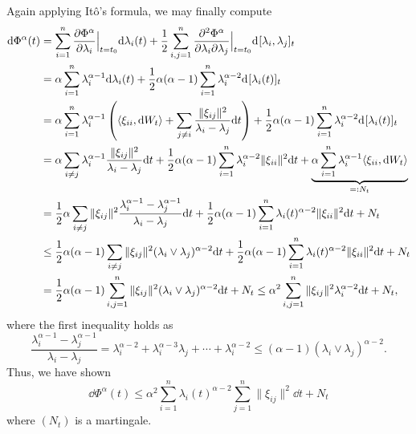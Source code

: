 Again applying Itô's formula, we may finally compute
\begin{align*}
  \dd \Phi^\alpha(t) & = \sum_{i = 1}^n \pdv{\Phi^\alpha}{\lambda_i}\Big\vert_{t = t_0} \dd \lambda_i(t)
    + \frac{1}{2}\sum_{i, j = 1}^n \pdv[2]{\Phi^\alpha}{\lambda_i}{\lambda_j}\Big\vert_{t = t_0} \dd[][\lambda_i, \lambda_j]_{t}\\
  & = \alpha \sum_{i = 1}^n \lambda_i^{\alpha - 1} \dd \lambda_i(t)
    + \frac{1}{2}\alpha(\alpha - 1)\sum_{i = 1}^n \lambda_i^{\alpha - 2} \dd[][\lambda_i(t)]_{t}\\
  & = \alpha \sum_{i = 1}^n \lambda_i^{\alpha - 1} \left(\langle \xi_{ii}, \dd W_t\rangle 
    + \sum_{j \neq i} \frac{\|\xi_{ij}\|^2}{\lambda_i - \lambda_j} \dd t\right) 
    + \frac{1}{2}\alpha(\alpha - 1)\sum_{i = 1}^n \lambda_i^{\alpha - 2} \dd[][\lambda_i(t)]_{t}\\
  & = \alpha \sum_{i \neq j}\lambda_i^{\alpha - 1} \frac{\|\xi_{ij}\|^2}{\lambda_i - \lambda_j} \dd t 
    + \frac{1}{2}\alpha(\alpha - 1)\sum_{i = 1}^n \lambda_i^{\alpha - 2} \|\xi_{ii}\|^2 \dd t
    + \underbrace{\alpha \sum_{i = 1}^n \lambda_i^{\alpha - 1} \langle \xi_{ii}, \dd W_t\rangle}_{=: N_t}\\
  & = \frac{1}{2}\alpha \sum_{i \neq j}\|\xi_{ij}\|^2\frac{\lambda_i^{\alpha - 1} - \lambda_j^{\alpha -1}}{\lambda_i - \lambda_j}\dd t
    + \frac{1}{2}\alpha(\alpha - 1)\sum_{i = 1}^n \lambda_i(t)^{\alpha - 2} \|\xi_{ii}\|^2 \dd t + N_t\\
  & \le \frac{1}{2}\alpha(\alpha - 1) \sum_{i \neq j}\|\xi_{ij}\|^2 (\lambda_i \vee \lambda_j)^{\alpha - 2} \dd t
    + \frac{1}{2}\alpha(\alpha - 1)\sum_{i = 1}^n \lambda_i(t)^{\alpha - 2} \|\xi_{ii}\|^2 \dd t + N_t\\
  & = \frac{1}{2}\alpha(\alpha - 1) \sum_{i, j = 1}^n\|\xi_{ij}\|^2 (\lambda_i \vee \lambda_j)^{\alpha - 2} \dd t
    + N_t
    \le \alpha^2 \sum_{i, j = 1}^n\|\xi_{ij}\|^2 \lambda_i^{\alpha - 2} \dd t + N_t,
\end{align*}
where the first inequality holds as 
\[\frac{\lambda_i^{\alpha - 1} - \lambda_j^{\alpha -1}}{\lambda_i - \lambda_j}
  = \lambda_i^{\alpha - 2} + \lambda_i^{\alpha - 3}\lambda_j + \cdots + \lambda_i^{\alpha - 2} 
  \le (\alpha - 1)(\lambda_i \vee \lambda_j)^{\alpha - 2}.\]
Thus, we have shown 
\begin{equation}
  \dd \Phi^\alpha(t) \le \alpha^2 \sum_{i = 1}^n \lambda_i(t)^{\alpha - 2} \sum_{j = 1}^n \|\xi_{ij}\|^2 \dd t + N_t
\end{equation}
where \((N_t)\) is a martingale.

